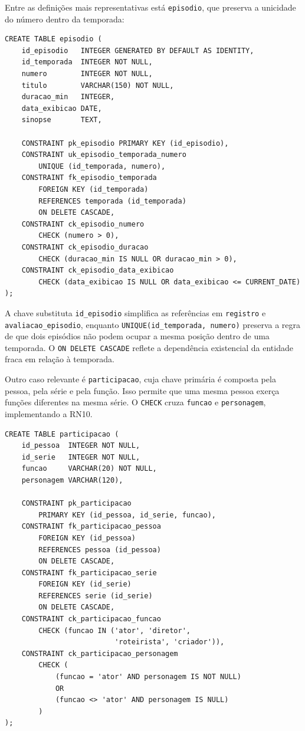 \documentclass[a4paper,12pt,oneside,openany]{book}
\newcommand{\id}[1]{\texttt{#1}}
\begin{document}
Entre as definições mais representativas está \id{episodio}, que preserva a
unicidade do número dentro da temporada:

\begin{lstlisting}[caption={Definição da entidade fraca \id{episodio}},label={lst:ddl-episodio}]
CREATE TABLE episodio (
    id_episodio   INTEGER GENERATED BY DEFAULT AS IDENTITY,
    id_temporada  INTEGER NOT NULL,
    numero        INTEGER NOT NULL,
    titulo        VARCHAR(150) NOT NULL,
    duracao_min   INTEGER,
    data_exibicao DATE,
    sinopse       TEXT,

    CONSTRAINT pk_episodio PRIMARY KEY (id_episodio),
    CONSTRAINT uk_episodio_temporada_numero
        UNIQUE (id_temporada, numero),
    CONSTRAINT fk_episodio_temporada
        FOREIGN KEY (id_temporada)
        REFERENCES temporada (id_temporada)
        ON DELETE CASCADE,
    CONSTRAINT ck_episodio_numero
        CHECK (numero > 0),
    CONSTRAINT ck_episodio_duracao
        CHECK (duracao_min IS NULL OR duracao_min > 0),
    CONSTRAINT ck_episodio_data_exibicao
        CHECK (data_exibicao IS NULL OR data_exibicao <= CURRENT_DATE)
);
\end{lstlisting}

A chave substituta \id{id\_episodio} simplifica as referências em
\id{registro} e \id{avaliacao\_episodio}, enquanto
\id{UNIQUE(id\_temporada, numero)} preserva a regra de que dois episódios não
podem ocupar a mesma posição dentro de uma temporada. O \id{ON DELETE CASCADE}
reflete a dependência existencial da entidade fraca em relação à temporada.

Outro caso relevante é \id{participacao}, cuja chave primária é composta pela
pessoa, pela série e pela função. Isso permite que uma mesma pessoa exerça
funções diferentes na mesma série. O \id{CHECK} cruza \id{funcao} e
\id{personagem}, implementando a RN10.

\begin{lstlisting}[caption={Definição da relação \id{participacao}},label={lst:ddl-participacao}]
CREATE TABLE participacao (
    id_pessoa  INTEGER NOT NULL,
    id_serie   INTEGER NOT NULL,
    funcao     VARCHAR(20) NOT NULL,
    personagem VARCHAR(120),

    CONSTRAINT pk_participacao
        PRIMARY KEY (id_pessoa, id_serie, funcao),
    CONSTRAINT fk_participacao_pessoa
        FOREIGN KEY (id_pessoa)
        REFERENCES pessoa (id_pessoa)
        ON DELETE CASCADE,
    CONSTRAINT fk_participacao_serie
        FOREIGN KEY (id_serie)
        REFERENCES serie (id_serie)
        ON DELETE CASCADE,
    CONSTRAINT ck_participacao_funcao
        CHECK (funcao IN ('ator', 'diretor',
                          'roteirista', 'criador')),
    CONSTRAINT ck_participacao_personagem
        CHECK (
            (funcao = 'ator' AND personagem IS NOT NULL)
            OR
            (funcao <> 'ator' AND personagem IS NULL)
        )
);
\end{lstlisting}
\end{document}
